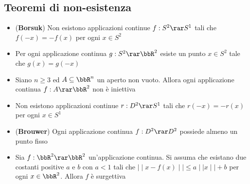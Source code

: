 \documentclass[a4paper,NoNotes,GeneralMath]{stdmdoc}
\begin{document}
	\subsection{Teoremi di non-esistenza}
	\begin{itemize}
		\item ({\bf Borsuk}) Non esistono applicazioni continue $f: S^2 \rar S^1$ tali che $f(-x) = -f(x)$ per ogni $x \in S^2$
		\item Per ogni applicazione continua $g: S^2 \rar \bbR^2$ esiste un punto $x \in S^2$ tale che $g(x) = g(-x)$
		\item Siano $n \ge 3$ ed $A \subseteq \bbR^n$ un aperto non vuoto. Allora ogni applicazione continua $f: A \rar \bbR^2$ non è iniettiva
		\item Non esistono applicazioni continue $r: D^2 \rar S^1$ tali che $r(-x) = -r(x)$ per ogni $x \in S^1$
		\item ({\bf Brouwer}) Ogni applicazione continua $f: D^2 \rar D^2$ possiede almeno un punto fisso
		\item Sia $f: \bbR^2 \rar \bbR^2$ un'applicazione continua. Si assuma che esistano due costanti positive $a$ e $b$ con $a < 1$ tali che $\mid\mid x - f(x) \mid\mid \le a \mid\mid x \mid\mid + b$ per ogni $x \in \bbR^2$. Allora $f$ è surgettiva
	\end{itemize}
\end{document}
